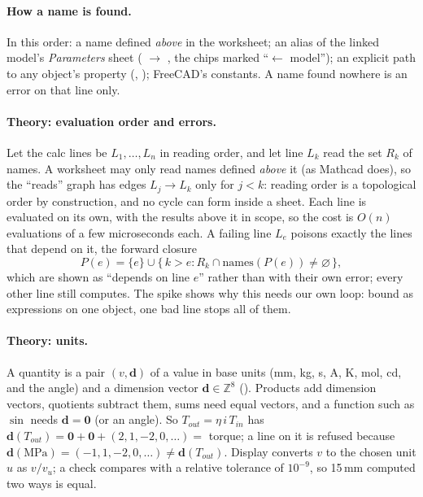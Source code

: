 \paragraph{How a name is found.} In this order: a name defined \emph{above} in the worksheet; an alias of the linked
model's \emph{Parameters} sheet ( $\to$ , the chips marked ``$\leftarrow$
model''); an explicit path to any object's property (, );
FreeCAD's constants. A name found nowhere is an error on that line only.

\paragraph{Theory: evaluation order and errors.} Let the calc lines be $L_1,\dots,L_n$ in reading order, and let line
$L_k$ read the set $R_k$ of names. A worksheet may only read names defined \emph{above} it (as Mathcad does), so the
``reads'' graph has edges $L_j \to L_k$ only for $j<k$: reading order is a topological order by construction, and no
cycle can form inside a sheet. Each line is evaluated on its own, with the results above it in scope, so the cost is
$O(n)$ evaluations of a few microseconds each. A failing line $L_e$ poisons exactly the lines that depend on it,
the forward closure
\[
  P(e) = \{e\} \cup \{\,k > e : R_k \cap \mathrm{names}(P(e)) \ne \varnothing\,\},
\]
which are shown as ``depends on line $e$'' rather than with their own error; every other line still computes. The
spike shows why this needs our own loop: bound as expressions on one object, one bad line stops all of them.

\paragraph{Theory: units.} A quantity is a pair $(v, \mathbf d)$ of a value in base units (mm, kg, s, A, K, mol, cd,
and the angle) and a dimension vector $\mathbf d \in \mathbb Z^8$ (). Products add dimension
vectors, quotients subtract them, sums need equal vectors, and a function such as $\sin$ needs $\mathbf d = \mathbf 0$
(or an angle). So $T_{out} = \eta\,i\,T_{in}$ has $\mathbf d(T_{out}) = \mathbf 0 + \mathbf 0 + (2,1,-2,0,\dots) =$
torque; a line  on it is refused because $\mathbf d(\mathrm{MPa}) = (-1,1,-2,0,\dots) \neq \mathbf
d(T_{out})$. Display converts $v$ to the chosen unit $u$ as $v/v_u$; a check  compares with a
relative tolerance of $10^{-9}$, so 15\,mm computed two ways is equal.

